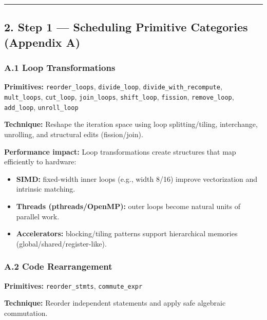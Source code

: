 \begin{center}\rule{0.5\linewidth}{0.5pt}\end{center}

\hypertarget{step-1-scheduling-primitive-categories-appendix-a}{%
\subsection{2. Step 1 --- Scheduling Primitive Categories (Appendix A)}\label{step-1-scheduling-primitive-categories-appendix-a}}

\hypertarget{a.1-loop-transformations}{%
\subsubsection{A.1 Loop Transformations}\label{a.1-loop-transformations}}

\textbf{Primitives:} \texttt{reorder\_loops}, \texttt{divide\_loop}, \texttt{divide\_with\_recompute}, \texttt{mult\_loops},
\texttt{cut\_loop}, \texttt{join\_loops}, \texttt{shift\_loop}, \texttt{fission}, \texttt{remove\_loop},
\texttt{add\_loop}, \texttt{unroll\_loop}

\textbf{Technique:} Reshape the iteration space using loop splitting/tiling, interchange, unrolling, and structural edits (fission/join).

\textbf{Performance impact:} Loop transformations create structures that map efficiently to hardware:
\begin{itemize}
  \item \textbf{SIMD:} fixed-width inner loops (e.g., width 8/16) improve vectorization and intrinsic matching.
  \item \textbf{Threads (pthreads/OpenMP):} outer loops become natural units of parallel work.
  \item \textbf{Accelerators:} blocking/tiling patterns support hierarchical memories (global/shared/register-like).
\end{itemize}

\hypertarget{a.2-code-rearrangement}{%
\subsubsection{A.2 Code Rearrangement}\label{a.2-code-rearrangement}}

\textbf{Primitives:} \texttt{reorder\_stmts}, \texttt{commute\_expr}

\textbf{Technique:} Reorder independent statements and apply safe algebraic commutation.

